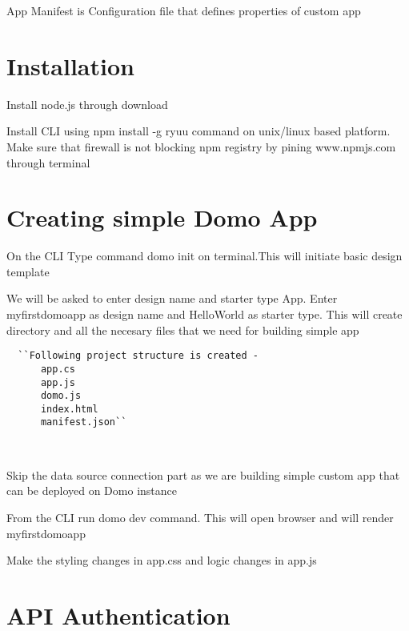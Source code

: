 App Manifest is Configuration file that defines properties 
of custom app


\section{Installation}

Install node.js through download

Install CLI using npm install -g ryuu command on unix/linux based platform. 
Make sure that firewall is not blocking npm registry by pining 
www.npmjs.com through terminal


\section{Creating simple Domo App}
On the CLI Type command  domo init on terminal.This will initiate basic 
design template

We will be asked to enter design name and starter type App. 
Enter myfirstdomoapp as design name and HelloWorld as starter type. 
This will create directory and all the necesary files that we need for 
building simple app

\begin{verbatim}
  ``Following project structure is created -
      app.cs
      app.js
      domo.js
      index.html
      manifest.json``
\end{verbatim}
~\cite{hid-sp18-523-Dev}

Skip the data source connection part as we are building simple
custom app that can be deployed on Domo instance

From the CLI run domo dev command. This will open browser and will 
render myfirstdomoapp

Make the styling changes in app.css and logic changes in app.js

\section{API Authentication}


